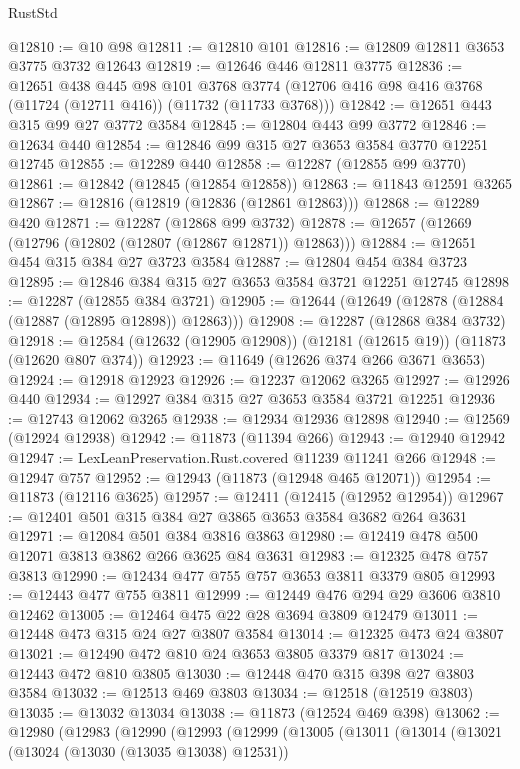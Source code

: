 \begin{lexlean}{RustStd}
\begin{coremodule}
@12810 := @10 @98
@12811 := @12810 @101
@12816 := @12809 @12811 @3653 @3775 @3732 @12643
@12819 := @12646 @446 @12811 @3775
@12836 := @12651
    @438
    @445
    @98
    @101
    @3768
    @3774
    (@12706 @416 @98 @416 @3768 (@11724 (@12711 @416)) (@11732 (@11733 @3768)))
@12842 := @12651 @443 @315 @99 @27 @3772 @3584
@12845 := @12804 @443 @99 @3772
@12846 := @12634 @440
@12854 := @12846 @99 @315 @27 @3653 @3584 @3770 @12251 @12745
@12855 := @12289 @440
@12858 := @12287 (@12855 @99 @3770)
@12861 := @12842 (@12845 (@12854 @12858))
@12863 := @11843 @12591 @3265
@12867 := @12816 (@12819 (@12836 (@12861 @12863)))
@12868 := @12289 @420
@12871 := @12287 (@12868 @99 @3732)
@12878 := @12657 (@12669 (@12796 (@12802 (@12807 (@12867 @12871)) @12863)))
@12884 := @12651 @454 @315 @384 @27 @3723 @3584
@12887 := @12804 @454 @384 @3723
@12895 := @12846 @384 @315 @27 @3653 @3584 @3721 @12251 @12745
@12898 := @12287 (@12855 @384 @3721)
@12905 := @12644 (@12649 (@12878 (@12884 (@12887 (@12895 @12898)) @12863)))
@12908 := @12287 (@12868 @384 @3732)
@12918 := @12584 (@12632 (@12905 @12908)) (@12181 (@12615 @19)) (@11873 (@12620 @807 @374))
@12923 := @11649 (@12626 @374 @266 @3671 @3653)
@12924 := @12918 @12923
@12926 := @12237 @12062 @3265
@12927 := @12926 @440
@12934 := @12927 @384 @315 @27 @3653 @3584 @3721 @12251
@12936 := @12743 @12062 @3265
@12938 := @12934 @12936 @12898
@12940 := @12569 (@12924 @12938)
@12942 := @11873 (@11394 @266)
@12943 := @12940 @12942
@12947 := LexLeanPreservation.Rust.covered @11239 @11241 @266
@12948 := @12947 @757
@12952 := @12943 (@11873 (@12948 @465 @12071))
@12954 := @11873 (@12116 @3625)
@12957 := @12411 (@12415 (@12952 @12954))
@12967 := @12401 @501 @315 @384 @27 @3865 @3653 @3584 @3682 @264 @3631
@12971 := @12084 @501 @384 @3816 @3863
@12980 := @12419 @478 @500 @12071 @3813 @3862 @266 @3625 @84 @3631
@12983 := @12325 @478 @757 @3813
@12990 := @12434 @477 @755 @757 @3653 @3811 @3379 @805
@12993 := @12443 @477 @755 @3811
@12999 := @12449 @476 @294 @29 @3606 @3810 @12462
@13005 := @12464 @475 @22 @28 @3694 @3809 @12479
@13011 := @12448 @473 @315 @24 @27 @3807 @3584
@13014 := @12325 @473 @24 @3807
@13021 := @12490 @472 @810 @24 @3653 @3805 @3379 @817
@13024 := @12443 @472 @810 @3805
@13030 := @12448 @470 @315 @398 @27 @3803 @3584
@13032 := @12513 @469 @3803
@13034 := @12518 (@12519 @3803)
@13035 := @13032 @13034
@13038 := @11873 (@12524 @469 @398)
@13062 := @12980
    (@12983
      (@12990
        (@12993
          (@12999
            (@13005
              (@13011
                (@13014
                  (@13021
                    (@13024 (@13030 (@13035 @13038) @12531))

\end{coremodule}
\end{lexlean}
